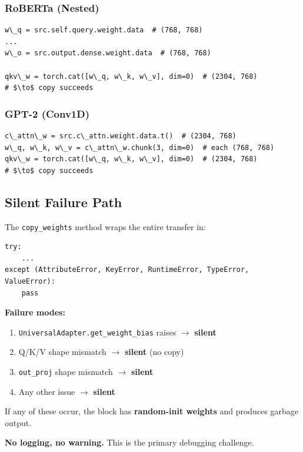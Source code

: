 \subsubsection{RoBERTa (Nested)}

\begin{lstlisting}
w\_q = src.self.query.weight.data  # (768, 768)
...
w\_o = src.output.dense.weight.data  # (768, 768)

qkv\_w = torch.cat([w\_q, w\_k, w\_v], dim=0)  # (2304, 768)
# $\to$ copy succeeds
\end{lstlisting}

\subsubsection{GPT-2 (Conv1D)}

\begin{lstlisting}
c\_attn\_w = src.c\_attn.weight.data.t()  # (2304, 768)
w\_q, w\_k, w\_v = c\_attn\_w.chunk(3, dim=0)  # each (768, 768)
qkv\_w = torch.cat([w\_q, w\_k, w\_v], dim=0)  # (2304, 768)
# $\to$ copy succeeds
\end{lstlisting}

\subsection{Silent Failure Path}

The \texttt{copy\_weights} method wraps the entire transfer in:

\begin{lstlisting}
try:
    ...
except (AttributeError, KeyError, RuntimeError, TypeError, ValueError):
    pass
\end{lstlisting}

\textbf{Failure modes:}
\begin{enumerate}
\item \texttt{UniversalAdapter.get\_weight\_bias} raises $\to$ \textbf{silent}
\item Q/K/V shape mismatch $\to$ \textbf{silent} (no copy)
\item \texttt{out\_proj} shape mismatch $\to$ \textbf{silent}
\item Any other issue $\to$ \textbf{silent}

\end{enumerate}
If any of these occur, the block has \textbf{random-init weights} and produces 
garbage output.

\textbf{No logging, no warning.} This is the primary debugging challenge.

